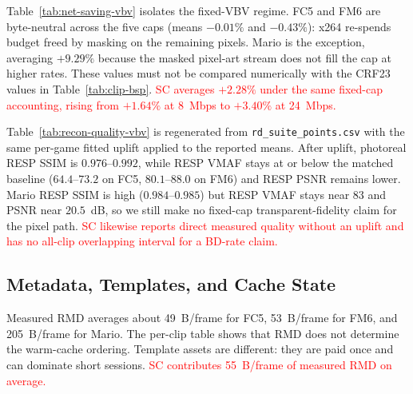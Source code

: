 Table~\ref{tab:net-saving-vbv} isolates the fixed-VBV regime. FC5 and FM6 are
byte-neutral across the five caps (means $-0.01\%$ and $-0.43\%$): x264
re-spends budget freed by masking on the remaining pixels. Mario is the
exception, averaging $+9.29\%$ because the masked pixel-art stream does not
fill the cap at higher rates. These values must not be compared numerically
with the CRF23 values in Table~\ref{tab:clip-bsp}.
\textcolor{red}{SC averages $+2.28\%$ under the same fixed-cap accounting,
rising from $+1.64\%$ at 8~Mbps to $+3.40\%$ at 24~Mbps.}

\begin{table}[t]
  \centering
  \small
  \caption{Net delivered saving (\%) under matched fixed VBV caps
  (video${+}$RMD), mean over five clips.}
  \label{tab:net-saving-vbv}
  
\end{table}

Table~\ref{tab:recon-quality-vbv} is regenerated from
\texttt{rd\_suite\_points.csv} with the same per-game fitted uplift applied to
the reported means. After uplift, photoreal RESP SSIM is $0.976$--$0.992$,
while RESP VMAF stays at or below the matched baseline
($64.4$--$73.2$ on FC5, $80.1$--$88.0$ on FM6) and RESP PSNR remains lower.
Mario RESP SSIM is high ($0.984$--$0.985$) but RESP VMAF stays near $83$ and
PSNR near $20.5$~dB, so we still make no fixed-cap transparent-fidelity claim
for the pixel path.
\textcolor{red}{SC likewise reports direct measured quality without an uplift and
has no all-clip overlapping interval for a BD-rate claim.}

\begin{table}[t]
  \centering
  \small
  \caption{Full-frame quality under fixed VBV after the fitted uplift:
  baseline (Base) vs.\ \sysname (RESP), five-clip means. Reference is the
  original source. Higher is better.}
  \label{tab:recon-quality-vbv}
  
\end{table}

\subsection{Metadata, Templates, and Cache State}
\label{sec:res-netbw}

Measured RMD averages about 49~B/frame for FC5, 53~B/frame for FM6, and
205~B/frame for Mario. The per-clip table shows that RMD does not determine the
warm-cache ordering. Template assets are different: they are paid once and
can dominate short sessions.
\textcolor{red}{SC contributes 55~B/frame of measured RMD on average.}

